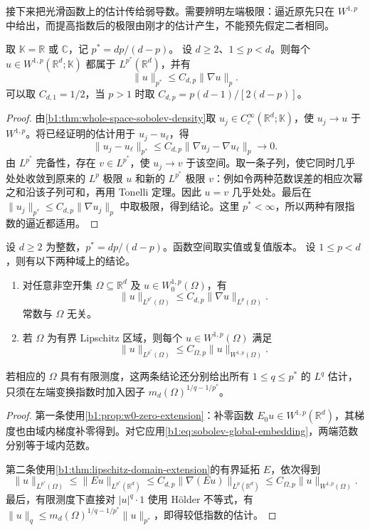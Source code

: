 接下来把光滑函数上的估计传给弱导数。需要辨明左端极限：逼近原先只在 \(W^{1,p}\) 中给出，而提高指数后的极限由刚才的估计产生，不能预先假定二者相同。

\begin{theorem}\label{b1:thm:sobolev-subcritical-embedding}
取 \(\mathbb K=\mathbb R\) 或 \(\mathbb C\)，记 \(p^*=dp/(d-p)\)。
设 \(d\geq2\)、\(1\leq p<d\)。则每个 \(u\in W^{1,p}(\mathbb R^d;\mathbb K)\) 都属于 \(L^{p^*}(\mathbb R^d)\)，并有
\begin{equation}\label{b1:eq:sobolev-global-embedding}
 \|u\|_{p^*}\leq C_{d,p}\|\nabla u\|_p.
\end{equation}
可以取 \(C_{d,1}=1/2\)，当 \(p>1\) 时取
\(C_{d,p}=p(d-1)/[2(d-p)]\)。
\end{theorem}
\begin{proof}
由\cref{b1:thm:whole-space-sobolev-density}取
\(u_j\in C_c^\infty(\mathbb R^d;\mathbb K)\)，使 \(u_j\to u\) 于 \(W^{1,p}\)。将已经证明的估计用于 \(u_j-u_\ell\)，得
\[
 \|u_j-u_\ell\|_{p^*}
 \leq C_{d,p}\|\nabla u_j-\nabla u_\ell\|_p\longrightarrow0.
\]
由 \(L^{p^*}\) 完备性，存在 \(v\in L^{p^*}\)，使 \(u_j\to v\) 于该空间。取一条子列，使它同时几乎处处收敛到原来的 \(L^p\) 极限 \(u\) 和新的 \(L^{p^*}\) 极限 \(v\)：例如令两种范数误差的相应次幂之和沿该子列可和，再用 Tonelli 定理。因此 \(u=v\) 几乎处处。最后在
\(\|u_j\|_{p^*}\leq C_{d,p}\|\nabla u_j\|_p\) 中取极限，得到结论。这里 \(p^*<\infty\)，所以两种有限指数的逼近都适用。
\end{proof}

\begin{corollary}\label{b1:cor:domain-sobolev-embedding}
设 \(d\geq2\) 为整数，\(p^*=dp/(d-p)\)。函数空间取实值或复值版本。
设 \(1\leq p<d\)，则有以下两种域上的结论。
\begin{enumerate}
\item\label{b1:item:domain-sobolev-zero-boundary}
对任意非空开集 \(\Omega\subseteq\mathbb R^d\) 及
\(u\in W_0^{1,p}(\Omega)\)，有
\[
 \|u\|_{L^{p^*}(\Omega)}
 \leq C_{d,p}\|\nabla u\|_{L^p(\Omega)}.
\]
常数与 \(\Omega\) 无关。
\item\label{b1:item:domain-sobolev-extension}
若 \(\Omega\) 为有界 Lipschitz 区域，则每个
\(u\in W^{1,p}(\Omega)\) 满足
\[
 \|u\|_{L^{p^*}(\Omega)}
 \leq C_{\Omega,p}\|u\|_{W^{1,p}(\Omega)}.
\]
\end{enumerate}
若相应的 \(\Omega\) 具有有限测度，这两条结论还分别给出所有
\(1\leq q\leq p^*\) 的 \(L^q\) 估计，只须在左端变换指数时加入因子
\(m_d(\Omega)^{1/q-1/p^*}\)。
\end{corollary}
\begin{proof}
第一条使用\cref{b1:prop:w0-zero-extension}：补零函数
\(E_0u\in W^{1,p}(\mathbb R^d)\)，其梯度也由域内梯度补零得到。对它应用\eqref{b1:eq:sobolev-global-embedding}，两端范数分别等于域内范数。

第二条使用\cref{b1:thm:lipschitz-domain-extension}的有界延拓 \(E\)，依次得到
\[
 \|u\|_{L^{p^*}(\Omega)}
 \leq\|Eu\|_{L^{p^*}(\mathbb R^d)}
 \leq C_{d,p}\|\nabla(Eu)\|_{L^p(\mathbb R^d)}
 \leq C_{\Omega,p}\|u\|_{W^{1,p}(\Omega)}.
\]
最后，有限测度下直接对 \(|u|^q\cdot1\) 使用 Hölder 不等式，有
\(\|u\|_q\leq m_d(\Omega)^{1/q-1/p^*}\|u\|_{p^*}\)，即得较低指数的估计。
\end{proof}

